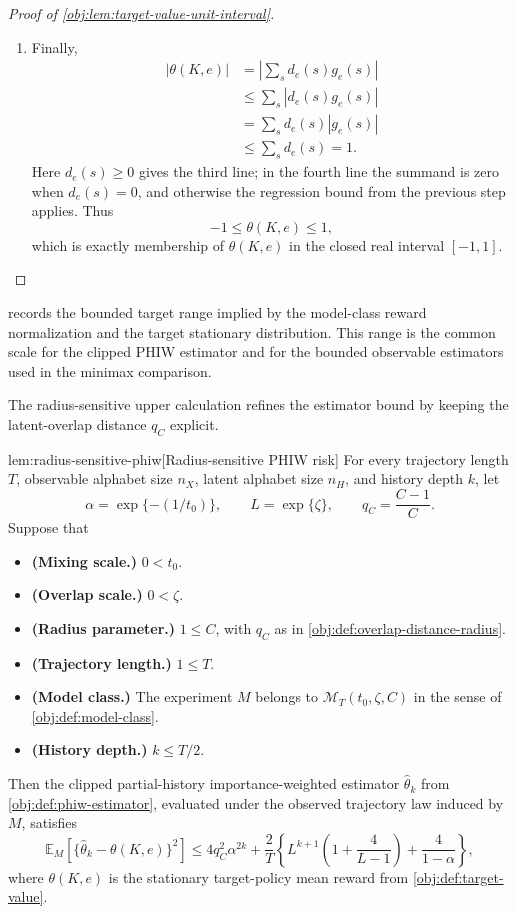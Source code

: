 \documentclass[11pt]{article}
\begin{document}
\begin{proof}[Proof of \cref{obj:lem:target-value-unit-interval}]
\begin{enumerate}
\item Finally,
\[
\begin{aligned}
|\theta(K,e)|
&=
\left|\sum_s d_e(s)g_e(s)\right| \\
&\le
\sum_s |d_e(s)g_e(s)| \\
&=
\sum_s d_e(s)|g_e(s)| \\
&\le
\sum_s d_e(s)
=1.
\end{aligned}
\]
Here \(d_e(s)\ge0\) gives the third line; in the fourth line the summand is zero when \(d_e(s)=0\), and otherwise the regression bound from the previous step applies. Thus
\[
-1\le \theta(K,e)\le 1,
\]
which is exactly membership of \(\theta(K,e)\) in the closed real interval \([-1,1]\).
\end{enumerate}
\end{proof}

 records the bounded target range implied by the model-class reward normalization and the target stationary distribution. This range is the common scale for the clipped PHIW estimator and for the bounded observable estimators used in the minimax comparison.

The radius-sensitive upper calculation refines the estimator bound by keeping the latent-overlap distance \(q_C\) explicit.

\begin{lemmav}{lem:radius-sensitive-phiw}[Radius-sensitive PHIW risk]
For every trajectory length \(T\), observable alphabet size \(n_X\), latent alphabet size \(n_H\), and history depth \(k\), let
\[
\alpha=\exp\{-(1/t_0)\},\qquad L=\exp\{\zeta\},\qquad q_C=\frac{C-1}{C}.
\]
Suppose that
\begin{itemize}
\item \textbf{(Mixing scale.)} \(0<t_0\).
\item \textbf{(Overlap scale.)} \(0<\zeta\).
\item \textbf{(Radius parameter.)} \(1\le C\), with \(q_C\) as in \cref{obj:def:overlap-distance-radius}.
\item \textbf{(Trajectory length.)} \(1\le T\).
\item \textbf{(Model class.)} The experiment \(M\) belongs to \(\mathcal M_T(t_0,\zeta,C)\) in the sense of \cref{obj:def:model-class}.
\item \textbf{(History depth.)} \(k\le T/2\).
\end{itemize}
Then the clipped partial-history importance-weighted estimator \(\widehat\theta_k\) from \cref{obj:def:phiw-estimator}, evaluated under the observed trajectory law induced by \(M\), satisfies
\[
\mathbb E_M\!\left[\{\widehat\theta_k-\theta(K,e)\}^2\right]
\le
4q_C^2\alpha^{2k}
+\frac{2}{T}\left\{
L^{k+1}\left(1+\frac{4}{L-1}\right)
+\frac{4}{1-\alpha}
\right\},
\]
where \(\theta(K,e)\) is the stationary target-policy mean reward from \cref{obj:def:target-value}.
\end{lemmav}
\end{document}
